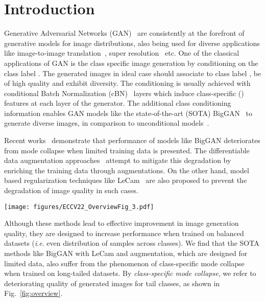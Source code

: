\documentclass[runningheads,table]{llncs}
\newcommand{\ie}{\textit{i}.\textit{e}. }
\begin{document}
\section{Introduction}
\label{sec:intro}
Generative Adversarial Networks (GAN)~\cite{goodfellow2014generative} are consistently at the forefront of generative models for image distributions, also being used for diverse applications like image-to-image translation~\cite{mao2019mode}, super resolution~\cite{ledig2017photo} etc. One of the classical applications of GAN is the class specific image generation by conditioning on the class label . The generated images in ideal case should associate to class label , be of high quality and exhibit diversity. The conditioning is usually achieved with conditional Batch Normalization (cBN)~\cite{de2017modulating} layers which induce class-specific () features at each layer of the generator. The additional class conditioning information enables GAN models like the state-of-the-art (SOTA) BigGAN~\cite{brock2018large} to generate diverse images, in comparison to unconditional models~\cite{kang2020contrastive}.

Recent works~\cite{zhao2020differentiable} demonstrate
that performance of models like BigGAN deteriorates from mode collapse when limited training data is presented. The differentiable data augmentation \mbox{approaches}~\cite{zhao2020differentiable, karras2020training, tran2021data} attempt to mitigate this degradation by enriching the training data through augmentations. On the other hand, model based regularization techniques like LeCam~\cite{tseng2021regularizing} are also proposed to prevent the degradation of image quality in such cases.

\begin{figure*}[t]
    \centering
    
    \texttt{[image: figures/ECCV22\_OverviewFig\_3.pdf]}
    \caption{\textbf{Regularizing GANs on long-tailed training data.} \emph{(left)} Images generated from BigGAN trained on long-tailed CIFAR-10. \emph{(right)} FID scores vs. training steps. The proposed gSR regularizer prevents mode collapse, for the tail classes~\cite{brock2018large, tseng2021regularizing, zhao2020differentiable}. }\label{fig:overview}
\end{figure*}Although these methods lead to effective improvement in image generation quality, they are designed to increase performance when trained on balanced datasets (\ie even distribution of samples across classes). We find that the SOTA methods like BigGAN  with LeCam and augmentation, which are designed for limited data, also suffer from the phenomenon of class-specific mode collapse when trained on long-tailed datasets. By \textit{class-specific mode collapse}, we refer to deteriorating quality of generated images for tail classes, as shown in Fig.~\ref{fig:overview}.
\end{document}
